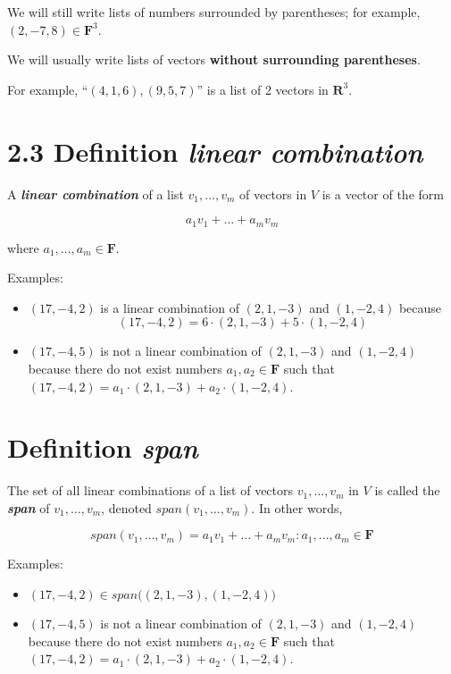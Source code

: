 \documentclass[12pt, letterpaper, oneside]{book}
\begin{document}
We will still write lists of numbers surrounded by parentheses; for example,
$(2, -7, 8) \in \mathbf{F}^3$.

We will usually write lists of vectors \textbf{without surrounding parentheses}.

For example, ``$(4, 1, 6), (9, 5, 7)$'' is a list of 2 vectors in
$\mathbf{R}^3$.

\section{2.3 Definition \textbf{\textit{linear combination}}}

A \textbf{\textit{linear combination}} of a list $v_1, \ldots, v_m$ of vectors
in $V$ is a vector of the form

\[
  a_1v_1 + \dots + a_mv_m
\]

where $a_1, \ldots, a_m \in \mathbf{F}$.

Examples:

\begin{itemize}
  \item $(17, -4, 2)$ is a linear combination of $(2, 1, -3)$ and $(1, -2, 4)$
    because
    \[
      (17, -4, 2) = 6 \cdot (2, 1, -3) + 5 \cdot (1, -2, 4)
    \]
  \item $(17, -4, 5)$ is not a linear combination of $(2, 1, -3)$ and
    $(1, -2, 4)$ because there do not exist numbers $a_1, a_2 \in \mathbf{F}$
    such that $(17, -4, 2) = a_1 \cdot (2, 1, -3) + a_2 \cdot (1, -2, 4)$.
\end{itemize}

\section{Definition \textbf{\textit{span}}}

The set of all linear combinations of a list of vectors $v_1, \ldots, v_m$ in
$V$ is called the \textbf{\textit{span}} of $v_1, \ldots, v_m$, denoted
$span(v_1, \ldots, v_m)$. In other words,

\[
  span(v_1, \ldots, v_m) = {a_1v_1 + \ldots + a_mv_m: a_1, \ldots, a_m \in
  \mathbf{F}}
\]

Examples:

\begin{itemize}
  \item $(17, -4, 2) \in span\bigl((2, 1, -3), (1, -2, 4)\bigr)$
  \item $(17, -4, 5)$ is not a linear combination of $(2, 1, -3)$ and
    $(1, -2, 4)$ because there do not exist numbers $a_1, a_2 \in \mathbf{F}$
    such that $(17, -4, 2) = a_1 \cdot (2, 1, -3) + a_2 \cdot (1, -2, 4)$.
\end{itemize}
\end{document}
